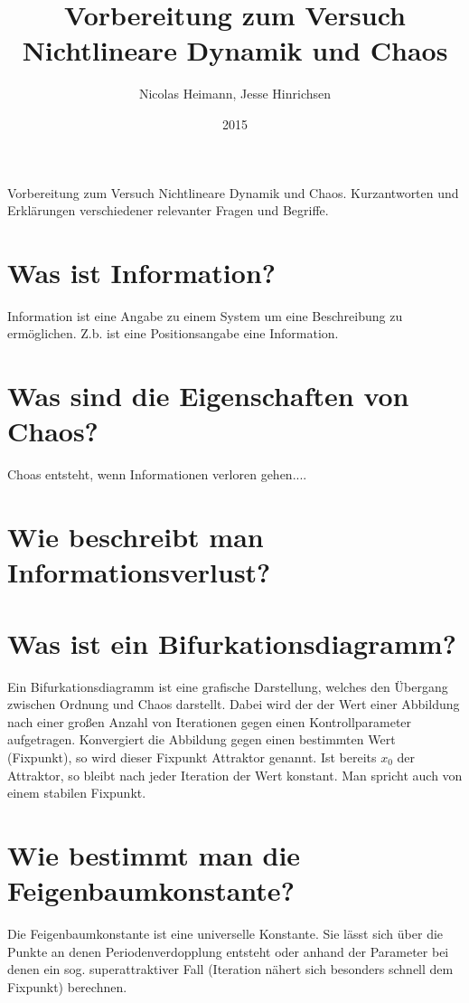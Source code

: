 \documentclass{scrartcl}
\title{Vorbereitung zum Versuch Nichtlineare Dynamik und Chaos}
\author{Nicolas Heimann, Jesse Hinrichsen}
\affil{\textit{Universität Hamburg}}
\date{2015}
\begin{document}
\maketitle




\begin{description}
\item Vorbereitung zum Versuch Nichtlineare Dynamik und Chaos. Kurzantworten und Erklärungen verschiedener relevanter Fragen und Begriffe.
\end{description}


\section{  Was ist Information?  }
Information ist eine Angabe zu einem System um eine Beschreibung zu ermöglichen. Z.b. ist eine Positionsangabe eine Information.

\section{  Was sind die Eigenschaften von Chaos?  }
Choas entsteht, wenn Informationen verloren gehen....

\section{  Wie beschreibt man Informationsverlust?  }


\section{  Was ist ein Bifurkationsdiagramm?  }
Ein Bifurkationsdiagramm ist eine grafische Darstellung, welches den Übergang zwischen Ordnung und Chaos darstellt. Dabei wird der der Wert einer Abbildung nach einer großen Anzahl von Iterationen gegen einen Kontrollparameter aufgetragen. Konvergiert die Abbildung gegen einen bestimmten Wert (Fixpunkt), so wird dieser Fixpunkt Attraktor genannt. Ist bereits $x_0$ der Attraktor, so bleibt nach jeder Iteration der Wert konstant. Man spricht auch von einem stabilen Fixpunkt.

\section{  Wie bestimmt man die Feigenbaumkonstante?  }
Die Feigenbaumkonstante ist eine universelle Konstante. Sie lässt sich über die Punkte an denen Periodenverdopplung entsteht oder anhand der Parameter bei denen ein sog. superattraktiver Fall (Iteration nähert sich besonders schnell dem Fixpunkt) berechnen.
\end{document}
